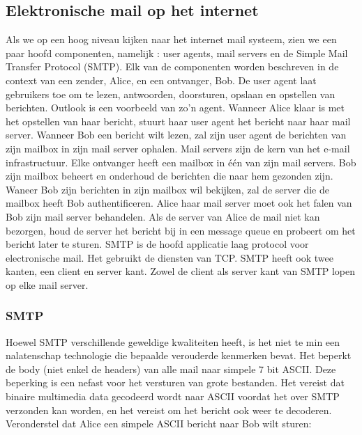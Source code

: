 \subsection{Elektronische mail op het internet}

Als we op een hoog niveau kijken naar het internet mail systeem, zien we een paar hoofd componenten, namelijk : user agents, mail servers en de Simple Mail Transfer Protocol (SMTP). Elk van de componenten worden beschreven in de context van een zender, Alice, en een ontvanger, Bob. De user agent laat gebruikers toe om te lezen, antwoorden, doorsturen, opslaan en opstellen van berichten. Outlook is een voorbeeld van zo’n agent. Wanneer Alice klaar is met het opstellen van haar bericht, stuurt haar user agent het bericht naar haar mail server. Wanneer Bob een bericht wilt lezen, zal zijn user agent de berichten van zijn mailbox in zijn mail server ophalen.
Mail servers zijn de kern van het e-mail infrastructuur. Elke ontvanger heeft een mailbox in één van zijn mail servers. Bob zijn mailbox beheert en onderhoud de berichten die naar hem gezonden zijn. Waneer Bob zijn berichten in zijn mailbox wil bekijken, zal de server die de mailbox heeft Bob authentificeren. Alice haar mail server moet ook het falen van Bob zijn mail server behandelen. Als de server van Alice de mail niet kan bezorgen, houd de server het bericht bij in een message queue en probeert om het bericht later te sturen. 
SMTP is de hoofd applicatie laag protocol voor electronische mail. Het gebruikt de diensten van TCP. SMTP heeft ook twee kanten, een client en server kant. Zowel de client als server kant van SMTP lopen op elke mail server.

\subsubsection{SMTP}

Hoewel SMTP verschillende geweldige kwaliteiten heeft, is het niet te min een nalatenschap technologie die bepaalde verouderde kenmerken bevat. Het beperkt de body (niet enkel de headers) van alle mail naar simpele 7 bit ASCII. Deze beperking is een nefast voor het versturen van grote bestanden. Het vereist dat binaire multimedia data gecodeerd wordt naar ASCII voordat het over SMTP verzonden kan worden, en het vereist om het bericht ook weer te decoderen.
Veronderstel dat Alice een simpele ASCII bericht naar Bob wilt sturen:

